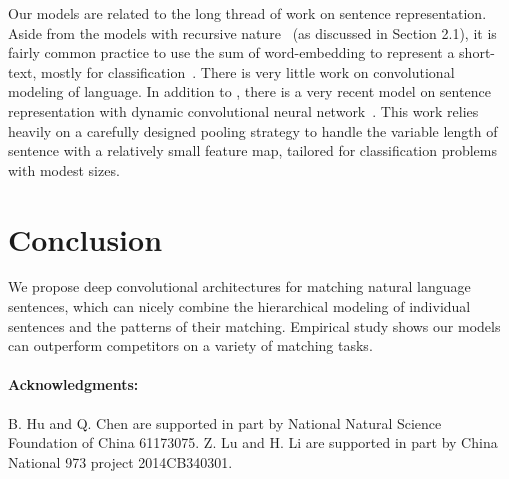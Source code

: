 \documentclass{article} %
\begin{document}
Our models are related to the long thread of work on sentence representation. Aside from the models with recursive nature~\cite{RNN,RAE,socher2011} (as discussed in Section 2.1), it is fairly common practice to use the sum of word-embedding to represent a short-text, mostly for classification~\cite{yangqiu}. There is very little work on convolutional modeling of language. In addition to \cite{senna,Shenwww2014}, there is a very recent model on sentence representation with dynamic convolutional neural network~\cite{oxford_cnn}. This work relies heavily on a carefully designed pooling strategy to handle the variable length of sentence with a relatively small feature map, tailored for classification problems with modest sizes. \vspace{-8pt}

\section{Conclusion}\vspace{-10pt}
We propose deep convolutional architectures for matching natural language sentences, which can nicely combine the hierarchical modeling of individual sentences and the patterns of their matching. Empirical study shows our models can outperform competitors on a variety of matching tasks.


\paragraph{Acknowledgments:}%
{\small B. Hu and Q. Chen are supported in part by National Natural Science Foundation of China 61173075.  Z. Lu and H. Li are supported in part  by China National 973 project 2014CB340301.}
\vspace{-10pt}

\small{}
\end{document}
